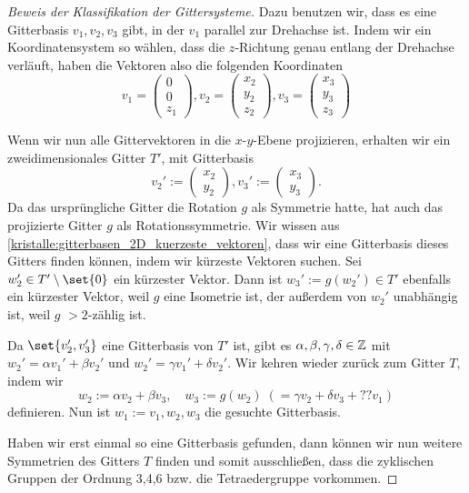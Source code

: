 \begin{proof}[Beweis der Klassifikation der Gittersysteme]
\medbreak
Dazu benutzen wir, dass es eine Gitterbasis $v_1,v_2,v_3$ gibt, in der $v_1$ parallel zur Drehachse ist. Indem wir ein Koordinatensystem so wählen, dass die $z$-Richtung genau entlang der Drehachse verläuft, haben die Vektoren also die folgenden Koordinaten
\[v_1 = \begin{pmatrix} 0 \\ 0 \\ z_1 \end{pmatrix}, v_2 = \begin{pmatrix} x_2 \\ y_2 \\ z_2 \end{pmatrix}, v_3 = \begin{pmatrix} x_3 \\ y_3 \\ z_3 \end{pmatrix}\]

Wenn wir nun alle Gittervektoren in die $x$-$y$-Ebene projizieren, erhalten wir ein zweidimensionales Gitter $T'$, mit Gitterbasis
\[v_2' := \begin{pmatrix} x_2 \\ y_2\end{pmatrix}, v_3' := \begin{pmatrix} x_3 \\ y_3 \end{pmatrix}.\]
Da das ursprüngliche Gitter die Rotation $g$ als Symmetrie hatte, hat auch das projizierte Gitter $g$ als Rotationssymmetrie. Wir wissen aus \ref{kristalle:gitterbasen_2D_kuerzeste_vektoren}, dass wir eine Gitterbasis dieses Gitters finden können, indem wir kürzeste Vektoren suchen. Sei $w_2'\in T'\setminus\set{0}$ ein kürzester Vektor. Dann ist $w_3':=g(w_2')\in T'$ ebenfalls ein kürzester Vektor, weil $g$ eine Isometrie ist, der außerdem von $w_2'$ unabhängig ist, weil $g$ $>2$-zählig ist.

Da $\set{v_2',v_3'}$ eine Gitterbasis von $T'$ ist, gibt es $\alpha,\beta,\gamma,\delta\in\mathbb{Z}$ mit $w_2'=\alpha v_1'+\beta v_2'$ und $w_2'=\gamma v_1'+\delta v_2'$. Wir kehren wieder zurück zum Gitter $T$, indem wir
\[w_2:=\alpha v_2+\beta v_3, \quad w_3 := g(w_2) \;(=\gamma v_2+\delta v_3+??v_1)\]
definieren. Nun ist $w_1:=v_1, w_2,w_3$ die gesuchte Gitterbasis.

\bigbreak
Haben wir erst einmal so eine Gitterbasis gefunden, dann können wir nun weitere Symmetrien des Gitters $T$ finden und somit ausschließen, dass die zyklischen Gruppen der Ordnung 3,4,6 bzw. die Tetraedergruppe vorkommen.


\end{proof}
